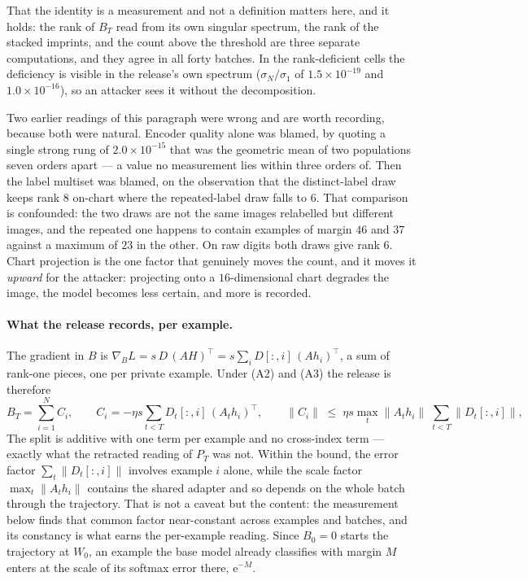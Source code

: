 That the identity is a measurement and not a definition matters here, and it
holds: the rank of $B_T$ read from its own singular spectrum, the rank of the
stacked imprints, and the count above the threshold are three separate
computations, and they agree in all forty batches. In the rank-deficient
cells the deficiency is visible in the release's own spectrum
($\sigma_N/\sigma_1$ of $1.5\times10^{-19}$ and $1.0\times10^{-16}$), so an
attacker sees it without the decomposition.

Two earlier readings of this paragraph were wrong and are worth recording,
because both were natural. Encoder quality alone was blamed, by quoting a
single strong rung of $2.0\times10^{-15}$ that was the geometric mean of two
populations seven orders apart — a value no measurement lies within three
orders of. Then the label multiset was blamed, on the observation that the
distinct-label draw keeps rank $8$ on-chart where the repeated-label draw
falls to $6$. That comparison is confounded: the two draws are not the same
images relabelled but different images, and the repeated one happens to
contain examples of margin $46$ and $37$ against a maximum of $23$ in the
other. On raw digits both draws give rank $6$. Chart projection is the one
factor that genuinely moves the count, and it moves it \emph{upward} for the
attacker: projecting onto a $16$-dimensional chart degrades the image, the
model becomes less certain, and more is recorded.

\paragraph{What the release records, per example.} The gradient in $B$ is
$\nabla_BL=s\,D\,(AH)^{\!\top}=s\sum_i D[:,i]\,(Ah_i)^{\!\top}$, a sum of
rank-one pieces, one per private example. Under (A2) and (A3) the release is
therefore
\begin{equation}\label{eq:imprint}
  B_T=\sum_{i=1}^N C_i,\qquad
  C_i=-\eta s\sum_{t<T} D_t[:,i]\,(A_th_i)^{\!\top},\qquad
  \|C_i\|\;\le\;\eta s\max_t\|A_th_i\|\;\sum_{t<T}\bigl\|D_t[:,i]\bigr\|,
\end{equation}
The split is additive with one term per example and no cross-index term —
exactly what the retracted reading of $P_T$ was not. Within the bound, the
error factor $\sum_t\|D_t[:,i]\|$ involves example $i$ alone, while the
scale factor $\max_t\|A_th_i\|$ contains the shared adapter and so depends
on the whole batch through the trajectory. That is not a caveat but the
content: the measurement below finds that common factor near-constant across
examples and batches, and its constancy is what earns the per-example
reading. Since $B_0=0$ starts the trajectory at $W_0$, an example the base
model already classifies with margin $M$ enters at the scale of its softmax
error there, $\mathrm e^{-M}$.

